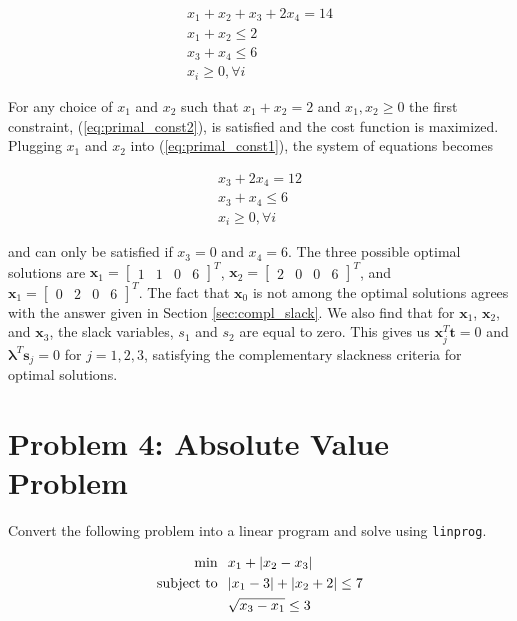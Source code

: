 \documentclass{article}
\begin{document}
\begin{align} \label{eq:primal_const1}
x_1 + x_2 + x_3 + 2x_4 = 14\\\label{eq:primal_const2}
x_1 + x_2 \le 2\\\label{eq:primal_const3}
x_3 + x_4 \le 6\\
x_i \ge 0, \forall i
\end{align}

\noindent For any choice of $x_1$ and $x_2$ such that $x_1 + x_2 = 2$ and $x_1, x_2 \ge 0$ the first constraint, (\ref{eq:primal_const2}), is satisfied and the cost function is maximized.
Plugging $x_1$ and $x_2 $ into (\ref{eq:primal_const1}), the system of equations becomes

\begin{align*}
x_3 + 2x_4 = 12\\
x_3 + x_4 \le 6\\
x_i \ge 0, \forall i
\end{align*}

\noindent and can only be satisfied if $x_3 = 0$ and $x_4 = 6$. The three possible optimal solutions are $\mathbf{x}_1 = \begin{bmatrix}1 & 1 & 0 & 6\end{bmatrix}^T$, $\mathbf{x}_2 = \begin{bmatrix}2 & 0 & 0 & 6\end{bmatrix}^T$, and $\mathbf{x}_1 = \begin{bmatrix}0 & 2 & 0 & 6\end{bmatrix}^T$.
The fact that $\mathbf{x}_0$ is not among the optimal solutions agrees with the answer given in Section \ref{sec:compl_slack}. 
We also find that for $\mathbf{x}_1$, $\mathbf{x}_2$, and $\mathbf{x}_3$, the slack variables, $s_1$ and $s_2$ are equal to zero.
This gives us $\mathbf{x}_j^T \mathbf{t} = 0$ and $\boldsymbol{\lambda}^T \mathbf{s}_j = 0$ for $j = 1, 2, 3$, satisfying the complementary slackness criteria for optimal solutions.

\newpage

\section{Problem 4: Absolute Value Problem}

Convert the following problem into a linear program and solve using \texttt{linprog}.

\begin{align*}
\text{min} & \hspace{0.1in} x_1 + |x_2 - x_3|\\
\text{subject to} & \hspace{0.1in} |x_1 - 3| + |x_2 + 2| \le 7\\
& \hspace{0.1in} \sqrt{x_3 - x_1} \le 3\\
\end{align*}
\end{document}
